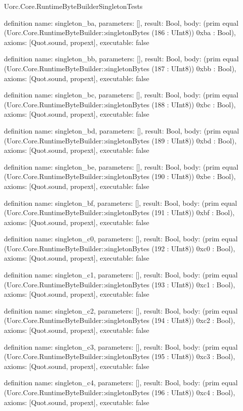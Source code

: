 \begin{lexlean}{Uorc.Core.RuntimeByteBuilderSingletonTests}
\begin{semanticmodule}
definition{
  name: singleton_ba,
  parameters: [],
  result: Bool,
  body: (prim equal (Uorc.Core.RuntimeByteBuilder::singletonBytes (186 : UInt8)) 0xba : Bool),
  axioms: [Quot.sound, propext],
  executable: false
}

definition{
  name: singleton_bb,
  parameters: [],
  result: Bool,
  body: (prim equal (Uorc.Core.RuntimeByteBuilder::singletonBytes (187 : UInt8)) 0xbb : Bool),
  axioms: [Quot.sound, propext],
  executable: false
}

definition{
  name: singleton_bc,
  parameters: [],
  result: Bool,
  body: (prim equal (Uorc.Core.RuntimeByteBuilder::singletonBytes (188 : UInt8)) 0xbc : Bool),
  axioms: [Quot.sound, propext],
  executable: false
}

definition{
  name: singleton_bd,
  parameters: [],
  result: Bool,
  body: (prim equal (Uorc.Core.RuntimeByteBuilder::singletonBytes (189 : UInt8)) 0xbd : Bool),
  axioms: [Quot.sound, propext],
  executable: false
}

definition{
  name: singleton_be,
  parameters: [],
  result: Bool,
  body: (prim equal (Uorc.Core.RuntimeByteBuilder::singletonBytes (190 : UInt8)) 0xbe : Bool),
  axioms: [Quot.sound, propext],
  executable: false
}

definition{
  name: singleton_bf,
  parameters: [],
  result: Bool,
  body: (prim equal (Uorc.Core.RuntimeByteBuilder::singletonBytes (191 : UInt8)) 0xbf : Bool),
  axioms: [Quot.sound, propext],
  executable: false
}

definition{
  name: singleton_c0,
  parameters: [],
  result: Bool,
  body: (prim equal (Uorc.Core.RuntimeByteBuilder::singletonBytes (192 : UInt8)) 0xc0 : Bool),
  axioms: [Quot.sound, propext],
  executable: false
}

definition{
  name: singleton_c1,
  parameters: [],
  result: Bool,
  body: (prim equal (Uorc.Core.RuntimeByteBuilder::singletonBytes (193 : UInt8)) 0xc1 : Bool),
  axioms: [Quot.sound, propext],
  executable: false
}

definition{
  name: singleton_c2,
  parameters: [],
  result: Bool,
  body: (prim equal (Uorc.Core.RuntimeByteBuilder::singletonBytes (194 : UInt8)) 0xc2 : Bool),
  axioms: [Quot.sound, propext],
  executable: false
}

definition{
  name: singleton_c3,
  parameters: [],
  result: Bool,
  body: (prim equal (Uorc.Core.RuntimeByteBuilder::singletonBytes (195 : UInt8)) 0xc3 : Bool),
  axioms: [Quot.sound, propext],
  executable: false
}

definition{
  name: singleton_c4,
  parameters: [],
  result: Bool,
  body: (prim equal (Uorc.Core.RuntimeByteBuilder::singletonBytes (196 : UInt8)) 0xc4 : Bool),
  axioms: [Quot.sound, propext],
  executable: false
}


\end{semanticmodule}
\end{lexlean}
